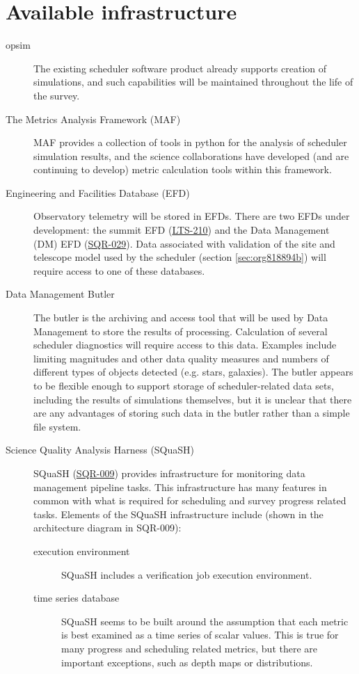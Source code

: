 \section{Available infrastructure}
\label{sec:org5290809}
\begin{description}
\item[{opsim}] The existing scheduler software product already supports creation of simulations, and such capabilities will be maintained throughout the life of the survey.
\item[{The Metrics Analysis Framework (MAF)}] MAF provides a collection of tools in python for the analysis of scheduler simulation results, and the science collaborations have developed (and are continuing to develop) metric calculation tools within this framework.
\item[{Engineering and Facilities Database (EFD)}] Observatory telemetry will be stored in EFDs. There are two EFDs under development: the summit EFD (\href{https://ls.st/LTS-210}{LTS-210}) and the Data Management (DM) EFD (\href{https://sqr-029.lsst.io/}{SQR-029}).  Data associated with validation of the site and telescope model used by the scheduler (section \ref{sec:org818894b}) will require access to one of these databases.
\item[{Data Management Butler}] The butler is the archiving and access tool that will be used by Data Management to store the results of processing. Calculation of several scheduler diagnostics will require access to this data. Examples include limiting magnitudes and other data quality measures and numbers of different types of objects detected (e.g. stars, galaxies). The butler appears to be flexible enough to support storage of scheduler-related data sets, including the results of simulations themselves, but it is unclear that there are any advantages of storing such data in the butler rather than a simple file system.
\item[{Science Quality Analysis Harness (SQuaSH)}] SQuaSH (\href{https://sqr-009.lsst.io/}{SQR-009}) provides infrastructure for monitoring data management pipeline tasks. This infrastructure has many features in common with what is required for scheduling and survey progress related tasks. Elements of the SQuaSH infrastructure include (shown in the architecture diagram in SQR-009):
\begin{description}
\item[{execution environment}] SQuaSH includes a verification job execution environment.
\item[{time series database}] SQuaSH seems to be built around the assumption that each metric is best examined as a time series of scalar values. This is true for many progress and scheduling related metrics, but there are important exceptions, such as depth maps or distributions.

\end{description}
\end{description}
